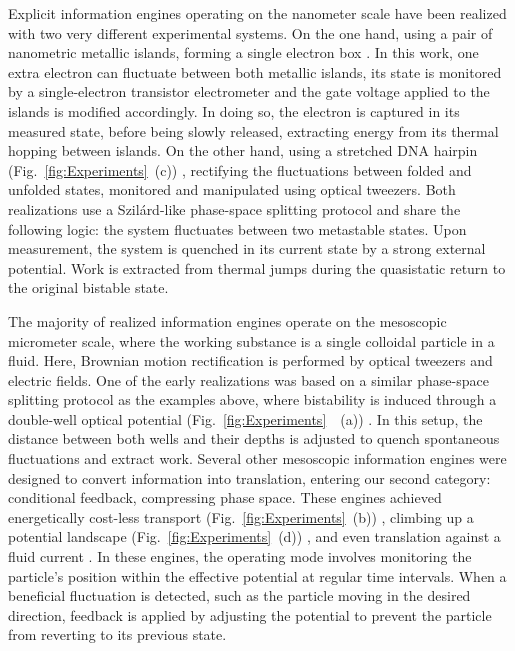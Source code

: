 \documentclass[aps, twocolumn,floatfix,showpacs, superscriptaddress]{revtex4-2}
\newcommand{\ie}{information engines }
\begin{document}
Explicit \ie operating on the nanometer scale have been realized with two very different experimental systems.
On the one hand, using a pair of nanometric metallic islands, forming a single electron box \cite{koski_experimental_2014}.
In this work, one extra electron can fluctuate between both metallic islands, its state is monitored by a single-electron transistor electrometer and the gate voltage applied to the islands is modified accordingly.
In doing so, the electron is captured in its measured state, before being slowly released, extracting energy from its thermal hopping between islands.
On the other hand, using a stretched DNA hairpin (Fig.~\ref{fig:Experiments}~(c)) \cite{Ribezzi_Crivellari_2019}, rectifying the fluctuations between folded and unfolded states, monitored and manipulated using optical tweezers. Both realizations use a Szil\'ard-like phase-space splitting protocol and share the following logic: the system fluctuates between two metastable states. Upon measurement, the system is quenched in its current state by a strong external potential. Work is extracted from thermal jumps during the quasistatic return to the original bistable state.

The majority of realized information engines operate on the mesoscopic micrometer scale, where the working substance is a single colloidal particle in a fluid. Here, Brownian motion rectification is performed by optical tweezers and electric fields. One of the early realizations was based on a similar phase-space splitting protocol as the examples above, where bistability is induced through a double-well optical potential (Fig.~\ref{fig:Experiments}~~(a)) \cite{roldan_universal_2014}. In this setup, the distance between both wells and their depths is adjusted to quench spontaneous fluctuations and extract work. Several other mesoscopic information engines were designed to convert information into translation, entering our second category: conditional feedback, compressing phase space. These engines achieved energetically cost-less transport (Fig.~\ref{fig:Experiments}~(b)) \cite{paneru_lossless_2018, lee_experimentally-achieved_2018}, climbing up a potential landscape (Fig.~\ref{fig:Experiments}~(d)) \cite{toyabe_experimental_2010, saha2021maximizing}, and even translation against a fluid current \cite{admon_experimental_2018}. In these engines, the operating mode involves monitoring the particle's position within the effective potential at regular time intervals. When a beneficial fluctuation is detected, such as the particle moving in the desired direction, feedback is applied by adjusting the potential to prevent the particle from reverting to its previous state.
\end{document}
